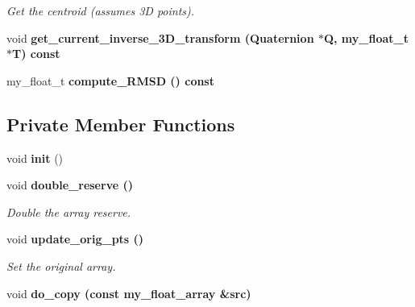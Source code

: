 \begin{CompactItemize}
\begin{CompactList}\small\item\em Get the centroid (assumes 3D points). \item\end{CompactList}\item 
void \bf{get\_\-current\_\-inverse\_\-3D\_\-transform} (Quaternion $\ast$Q, my\_\-float\_\-t $\ast$T) const 
\item 
my\_\-float\_\-t \bf{compute\_\-RMSD} () const 
\end{CompactItemize}
\subsection*{Private Member Functions}
\begin{CompactItemize}
\item 
void \textbf{init} ()\label{classASCbase_1_1my__float__array_cd4c500b6129b80a28b9aaf3c9253d2f}

\item 
void \bf{double\_\-reserve} ()\label{classASCbase_1_1my__float__array_70345204169e7017a18fb1c0de64336d}

\begin{CompactList}\small\item\em Double the array reserve. \item\end{CompactList}\item 
void \bf{update\_\-orig\_\-pts} ()\label{classASCbase_1_1my__float__array_2a888e41827034da0597d88b1e3470e7}

\begin{CompactList}\small\item\em Set the original array. \item\end{CompactList}\item 
void \bf{do\_\-copy} (const \bf{my\_\-float\_\-array} \&src)
\end{CompactItemize}
